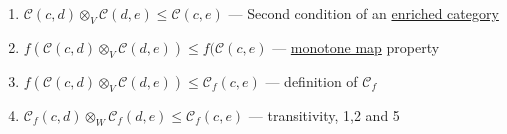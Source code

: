 \begin{itemize}
\begin{itemize}
\begin{enumerate}
                    \item $\mathcal{C}(c,d) \otimes_V \mathcal{C}(d,e) \leq \mathcal{C}(c,e)$ --- Second condition of an \href{doc/1 math/Seven Sketches in Compositionality/Chapter 2: Resource theories/3 Enrichment/1 V-categories/1 V-category}{enriched category}
                    \item $f(\mathcal{C}(c,d) \otimes_V \mathcal{C}(d,e)) \leq f(\mathcal{C}(c,e)$ --- \href{doc/1 math/Seven Sketches in Compositionality/Chapter 1: Generative Effects/4 Monotone maps/1 Monotone map}{monotone map} property
                    \item $f(\mathcal{C}(c,d) \otimes_V \mathcal{C}(d,e)) \leq \mathcal{C}_f(c,e)$ --- definition of $\mathcal{C}_f$
                    \item $\mathcal{C}_f(c,d) \otimes_W \mathcal{C}_f(d,e) \leq \mathcal{C}_f(c,e)$ --- transitivity, 1,2 and 5
                  \end{enumerate}
          \end{itemize}
  \end{itemize}
